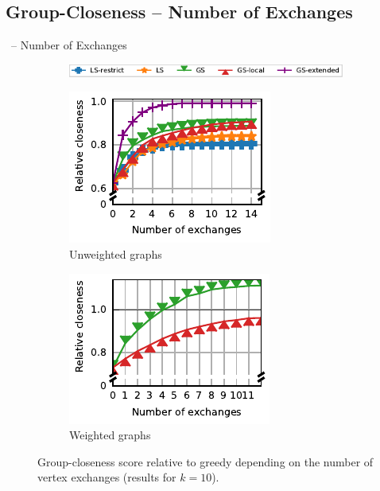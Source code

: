 \documentclass[10pt,titlepage,english,presentation]{beamer}
\begin{document}
\subsection{Group-Closeness -- Number of Exchanges}

\begin{frame}[t]{\growshrink\ -- Number of Exchanges}

\begin{figure}
\centering
\begin{subfigure}[t]{.8\textwidth}
\centering
\includegraphics{../sources/plots/local-search-heu/legend-unweighted.pdf}
\end{subfigure}\smallskip

\begin{subfigure}[t]{.5\textwidth}
\centering
\includegraphics[width=.7\textwidth]{../sources/plots/local-search-heu/impact-num-exchanges-unweighted.pdf}
\caption*{\scriptsize Unweighted graphs}
\end{subfigure}\hfill
\begin{subfigure}[t]{.5\textwidth}
\centering
\includegraphics[width=.7\textwidth]{../sources/plots/local-search-heu/impact-num-exchanges-weighted.pdf}
\caption*{\scriptsize Weighted graphs}
\end{subfigure}
\caption*{\footnotesize Group-closeness score relative to greedy depending on the number of vertex exchanges
(results for $k = 10$).}
\end{figure}
\end{frame}
\end{document}
